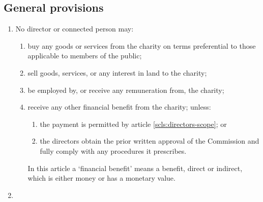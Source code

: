 \begin{enumerate}
  \subsection{General provisions}
  \label{cls:benefits-payments}
  \begin{enumerate}
  \item
    \label{scls:directors-remuneration} No director or connected person
    may:
    \begin{enumerate}
    \item
      buy any goods or services from the charity on terms preferential to
      those applicable to members of the public;
    \item
      sell goods, services, or any interest in land to the charity;
    \item
      be employed by, or receive any remuneration from, the charity;
    \item
      receive any other financial benefit from the charity; unless:
      \begin{enumerate}
      \item
        the payment is permitted by article \ref{scls:directors-scope}; or
      \item
        the directors obtain the prior written approval of the Commission
        and fully comply with any procedures it prescribes. 
      \end{enumerate}
        In this article
        a `financial benefit' means a benefit, direct or indirect, which is
        either money or has a monetary value.
    \end{enumerate}

  \item

\end{enumerate}
\end{enumerate}
